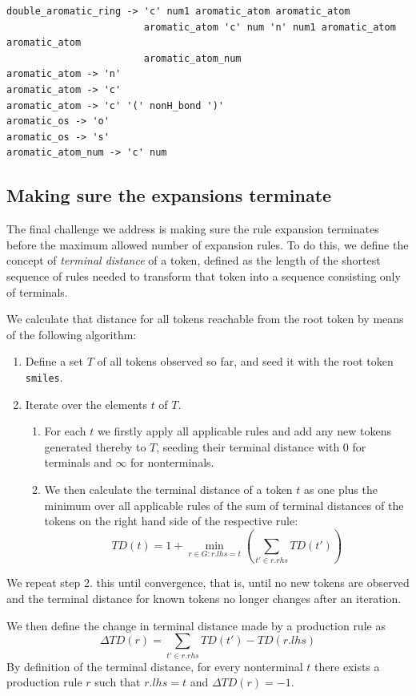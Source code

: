 \documentclass{article}
\begin{document}
{\footnotesize \begin{verbatim}
double_aromatic_ring -> 'c' num1 aromatic_atom aromatic_atom 
                        aromatic_atom 'c' num 'n' num1 aromatic_atom aromatic_atom
                        aromatic_atom_num
aromatic_atom -> 'n'
aromatic_atom -> 'c'
aromatic_atom -> 'c' '(' nonH_bond ')'
aromatic_os -> 'o'
aromatic_os -> 's'
aromatic_atom_num -> 'c' num
\end{verbatim}}
\subsection{Making sure the expansions terminate}
The final challenge we address is making sure the rule expansion terminates before the maximum allowed number of expansion rules. To do this, we define the concept of \emph{terminal distance} of a token, defined as the length of the shortest sequence of rules needed to transform that token into a sequence consisting only of terminals. 

We calculate that distance for all tokens reachable from the root token by means of the following algorithm: 
\begin{enumerate}
	\item Define a set $T$ of all tokens observed so far, and seed it with the root token \verb+smiles+. 
	\item Iterate over the elements $t$ of $T$. 
	\begin{enumerate}
		\item For each $t$ we firstly apply all applicable rules and add any new tokens generated thereby to $T$, seeding their terminal distance with 0 for terminals and $\infty$ for nonterminals.
		\item We then calculate the terminal distance of a token $t$ as one plus the minimum over all applicable rules of the sum of terminal distances of the tokens on the right hand side of the respective rule:
		\begin{equation}\label{eq:td}
		TD(t)=1 + \min_{r \in G: r.lhs = t}\left(\sum_{t' \in r.rhs} TD(t') \right)
		\end{equation}
	\end{enumerate}
\end{enumerate}

We repeat step 2. this until convergence, that is, until no new tokens are observed and the terminal distance for known tokens no longer changes after an iteration.

We then define the change in terminal distance made by a production rule as 
\begin{equation}\label{eq:dtd}
\Delta TD(r) =  \sum_{t' \in r.rhs} TD(t') - TD(r.lhs)
\end{equation}
By definition of the terminal distance, for every nonterminal $t$ there exists a production rule $r$ such that $r.lhs = t $ and $\Delta TD(r) = -1$.
\end{document}
